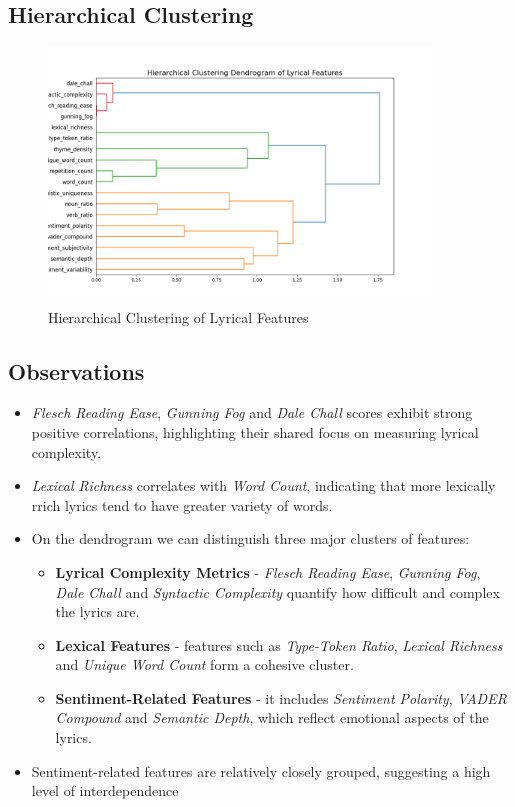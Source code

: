 \subsection*{Hierarchical Clustering}
\label{sec:hierarchicalclustering}

\begin{center}
\begin{figure}[H]
  \centering
  \includegraphics[width=4in]{img/dendrogram_lyrical.png}
  \caption{Hierarchical Clustering of Lyrical Features}
  \label{Figure:dendrogram_spotify_features}
\end{figure}
\end{center}


\subsection*{Observations}

\begin{itemize}
  \item \textit{Flesch Reading Ease}, \textit{Gunning Fog} and \textit{Dale
    Chall} scores exhibit strong positive correlations, highlighting their
    shared focus on measuring lyrical complexity.
  \item \textit{Lexical Richness} correlates with \textit{Word Count},
    indicating that more lexically rrich lyrics tend to have  greater variety
    of words.
  \item On the dendrogram we can distinguish three major clusters of features:
    \begin{itemize}
      \item \textbf{Lyrical Complexity Metrics} - \textit{Flesch Reading Ease},
        \textit{Gunning Fog}, \textit{Dale Chall} and \textit{Syntactic
        Complexity } quantify how difficult and complex the lyrics are.
      \item  \textbf{Lexical Features} - features such as \textit{Type-Token
        Ratio}, \textit{Lexical Richness} and \textit{Unique Word Count} form a
        cohesive cluster.
      \item \textbf{Sentiment-Related Features} - it includes \textit{Sentiment
        Polarity}, \textit{VADER Compound} and \textit{Semantic Depth}, which
        reflect emotional aspects of the lyrics.
    \end{itemize}
  \item Sentiment-related features are relatively closely grouped, suggesting a
    high level of interdependence
\end{itemize}



